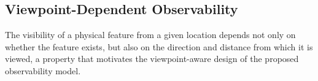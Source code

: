 \subsection{Viewpoint-Dependent Observability}
\label{sec:viewpoint_observability_background}

The visibility of a physical feature from a given location depends not only on whether the feature exists, but also on the direction and distance from which it is viewed, a property that motivates the viewpoint-aware design of the proposed observability model.
